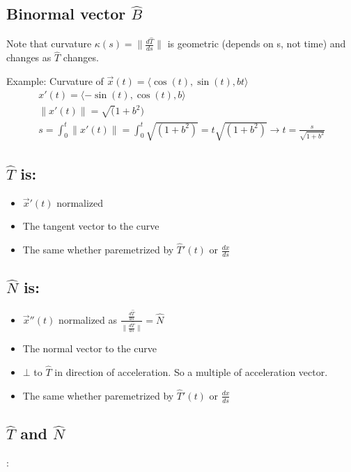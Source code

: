 \documentclass[11pt, oneside]{article}   	%
\begin{document}
\subsection{Binormal vector $\hat{B}$}

Note that curvature $\kappa(s) = \| \frac{d\hat{T}}{ds}\|$ is geometric (depends on s, not time) and changes as $\hat{T}$ changes.

Example: Curvature of $\overrightarrow{x}(t) = \langle \cos(t), \sin(t), bt \rangle$ 
\begin{align}
x'(t) = \langle -\sin(t), \cos(t), b \rangle \\ 
\|x'(t) \| = \sqrt(1 + b^2) \\ 
s = \int_0^t\|x'(t)\| = \int_0^t \sqrt{(1+b^2)} = t\sqrt{(1+b^2)} \rightarrow t = \frac{s}{\sqrt{1+b^2}}
\end{align}


\subsection{$\hat{T}$ is:} 
\begin{itemize}
\item $\overrightarrow{x}'(t)$ normalized
\item The tangent vector to the curve
\item The same whether paremetrized by $\hat{T}'(t)$ or $\frac{dx}{ds}$
\end{itemize}

\subsection{$\hat{N}$ is:} 
\begin{itemize}
\item $\overrightarrow{x}''(t)$ normalized as $\frac { \frac{d\hat{T}}{ds} }   {\|  \frac{d\hat{T}}{ds}  \|}  = \hat{N}$
\item The normal vector to the curve
\item $\bot$ to $\hat{T}$ in direction of acceleration.  So a multiple of acceleration vector.
\item The same whether paremetrized by $\hat{T}'(t)$ or $\frac{dx}{ds}$
\end{itemize}

\subsection{$\hat{T}$ and $\hat{N}$}:
\end{document}

